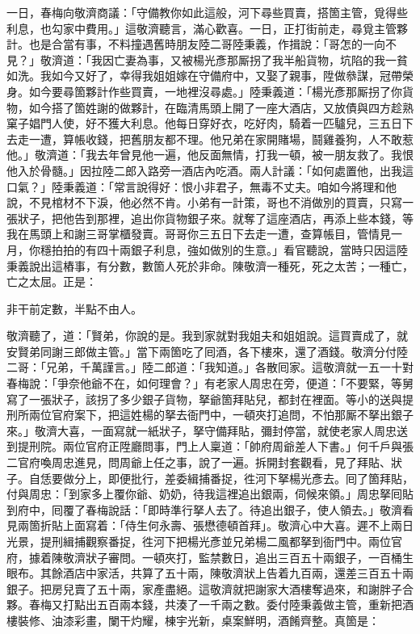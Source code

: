 一日，春梅向敬濟商議：「守備教你如此這般，河下尋些買賣，搭箇主管，覓得些利息，也勾家中費用。」這敬濟聽言，滿心歡喜。一日，正打街前走，尋覓主管夥計。也是合當有事，不料撞遇舊時朋友陸二哥陸秉義，作揖說：「哥怎的一向不見？」敬濟道：「我因亡妻為事，又被楊光彥那厮拐了我半船貨物，坑陷的我一貧如洗。我如今又好了，幸得我姐姐嫁在守備府中，又娶了親事，陞做叅謀，冠帶榮身。如今要尋箇夥計作些買賣，一地裡沒尋處。」陸秉義道：「楊光彥那厮拐了你貨物，如今搭了箇姓謝的做夥計，在臨清馬頭上開了一座大酒店，又放債與四方趁熟窠子娼門人使，好不獲大利息。他每日穿好衣，吃好肉，騎着一匹驢兒，三五日下去走一遭，算帳收錢，把舊朋友都不理。{}他兄弟在家開賭場，鬪雞養狗，人不敢惹他。」敬濟道：「我去年曾見他一遍，他反面無情，打我一頓，被一朋友救了。我恨他入於骨髓。」因拉陸二郎入路旁一酒店內吃酒。兩人計議：「如何處置他，出我這口氣？」陸秉義道：「常言說得好：恨小非君子，無毒不丈夫。咱如今將理和他說，不見棺材不下淚，他必然不肯。小弟有一計策，哥也不消做別的買賣，只寫一張狀子，把他告到那裡，追出你貨物銀子來。就奪了這座酒店，再添上些本錢，等我在馬頭上和謝三哥掌櫃發賣。哥哥你三五日下去走一遭，查算帳目，管情見一月，你穩拍拍的有四十兩銀子利息，強如做別的生意。」{}看官聽說，當時只因這陸秉義說出這樁事，有分數，數箇人死於非命。陳敬濟一種死，死之太苦；一種亡，亡之太屈。正是：

\begin{myquote}
非干前定數，半點不由人。
\end{myquote}

敬濟聽了，道：「賢弟，你說的是。我到家就對我姐夫和姐姐說。這買賣成了，就安賢弟同謝三郎做主管。」當下兩箇吃了囘酒，各下樓來，還了酒錢。敬濟分付陸二哥：「兄弟，千萬謹言。」陸二郎道：「我知道。」各散囘家。這敬濟就一五一十對春梅說：「爭奈他爺不在，如何理會？」有老家人周忠在旁，便道：「不要緊，等舅寫了一張狀子，該拐了多少銀子貨物，拏爺箇拜貼兒，都封在裡面。等小的送與提刑所兩位官府案下，把這姓楊的拏去衙門中，一頓夾打追問，不怕那厮不拏出銀子來。」{}敬濟大喜，一面寫就一紙狀子，拏守備拜貼，彌封停當，就使老家人周忠送到提刑院。兩位官府正陞廳問事，門上人稟道：「帥府周爺差人下書。」何千戶與張二官府喚周忠進見，問周爺上任之事，說了一遍。拆開封套觀看，見了拜貼、狀子。自恁要做分上，即便批行，差委緝捕番捉，徃河下拏楊光彥去。囘了箇拜貼，付與周忠：「到家多上覆你爺、奶奶，待我這裡追出銀兩，伺候來領。」周忠拏囘貼到府中，囘覆了春梅說話：「即時準行拏人去了。待追出銀子，使人領去。」敬濟看見兩箇折貼上面寫着：「侍生何永壽、張懋德頓首拜」。敬濟心中大喜。遲不上兩日光景，提刑緝捕觀察番捉，徃河下把楊光彥並兄弟楊二風都拏到衙門中。兩位官府，據着陳敬濟狀子審問。一頓夾打，監禁數日，追出三百五十兩銀子，一百桶生眼布。其餘酒店中家活，共算了五十兩，陳敬濟狀上告着九百兩，還差三百五十兩銀子。把房兒賣了五十兩，家產盡絕。這敬濟就把謝家大酒樓奪過來，和謝胖子合夥。春梅又打點出五百兩本錢，共湊了一千兩之數。委付陸秉義做主管，重新把酒樓裝修、油漆彩畫，闌干灼耀，棟宇光新，桌案鮮明，酒餚齊整。真箇是：

